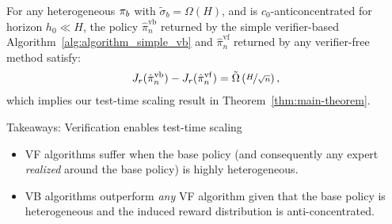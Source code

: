 \begin{tcolorbox}[colback=red!6!white,colframe=black,boxsep=0pt,top=4pt,bottom=4pt,left=3pt,right=3pt]
\begin{theorem}
\label{thm:vg-gap-lower-bound} For any heterogeneous $\pi_b$ with $\tilde{\sigma}_b = \Omega(H)$, and is $c_0$-anticoncentrated for horizon $h_0 \ll H$, the policy $\hat{\pi}_n^{\mathrm{vb}}$ returned by the simple verifier-based Algorithm~\ref{alg:algorithm_simple_vb} and $\hat{\pi}_n^{\mathrm{vf}}$ returned by any verifier-free method satisfy:
{
\setlength{\abovedisplayskip}{4pt}
\setlength{\belowdisplayskip}{4pt}
\begin{align*}
    J_r(\hat{\pi}_{n}^\mathrm{vb}) -  J_r(\hat{\pi}_{n}^\mathrm{vf})  = \Tilde{\Omega}\left( \nicefrac{H}{\sqrt{n}} \right),
\end{align*}}
which implies our test-time scaling result in Theorem~\ref{thm:main-theorem}.
\end{theorem}
\end{tcolorbox}








\begin{AIbox}{Takeaways: Verification enables test-time scaling}
\begin{itemize}[leftmargin=0em]
    \setlength\itemsep{0em}
    \item VF algorithms suffer when the base policy (and consequently any expert \emph{realized} around the base policy) is highly heterogeneous.   
    \item VB algorithms outperform \emph{any} VF algorithm given that the base policy is heterogeneous and the induced reward distribution is anti-concentrated.
\end{itemize}
\end{AIbox}

\vspace{0.1cm}

